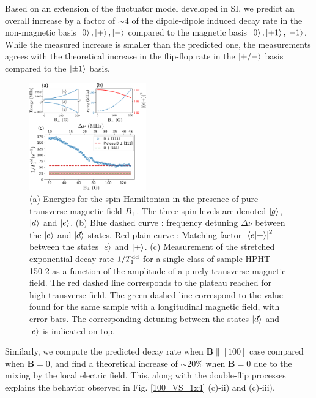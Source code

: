 \documentclass[preprintnumbers,amsmath,amssymb,superscriptaddress,twocolumn,showpacs]{revtex4-2}
\begin{document}
Based on an extension of the fluctuator model developed in SI, we predict an overall increase by a factor of $\sim 4$ of the dipole-dipole induced decay rate in the non-magnetic basis $\ket{0}, \ket{+}, \ket{-}$ compared to the magnetic basis $\ket{0}, \ket{+1}, \ket{-1}$. While the measured increase is smaller than the predicted one, the measurements agrees with the theoretical increase in the flip-flop rate in the $\ket{+/-}$ basis compared to the $\ket{\pm 1}$ basis.

\begin{figure}
\includegraphics[width=0.45\textwidth]{Figures/fig_transverse_field_V2.pdf}
\caption{(a) Energies for the spin Hamiltonian in the presence of pure transverse magnetic field $B_\perp$. The three spin levels are denoted $\ket{g}$, $\ket{d}$ and $\ket{e}$. (b) Blue dashed curve : frequency detuning $\Delta \nu$ between the $\ket{e}$ and $\ket{d}$ states. Red plain curve : Matching factor $\abs{\bra{e}\ket{+}}^2$ between the states $\ket{e}$ and $\ket{+}$. (c) Measurement of the stretched exponential decay rate $1/T_1^{\rm dd}$ for a single class of sample HPHT-150-2 as a function of the amplitude of a purely transverse magnetic field. The red dashed line corresponds to the plateau reached for high transverse field. The green dashed line correspond to the value found for the same sample with a longitudinal magnetic field, with error bars. The corresponding detuning between the states $\ket{d}$ and $\ket{e}$ is indicated on top.}
\label{B_transverse}
\end{figure}
Similarly, we compute the predicted decay rate when $\bm B \parallel \left[100\right]$ case compared when $\bm B = 0$, and find a theoretical increase of $\sim 20\%$ when $\bm B = 0$ due to the mixing by the local electric field. This, along with the double-flip processes explains the behavior observed in Fig. \ref{100_VS_1x4} (c)-ii) and (c)-iii).
\end{document}
